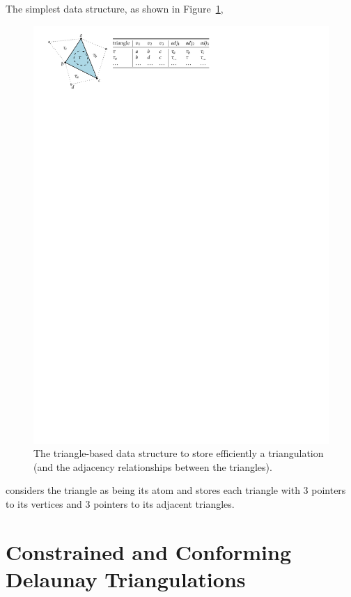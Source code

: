 The simplest data structure, as shown in Figure~\ref{fig:tr_ds}, 
\begin{figure}
  \centering
  \includegraphics[width=0.95\linewidth]{figs/tr_ds}
  \caption{The triangle-based data structure to store efficiently a triangulation (and the adjacency relationships between the triangles).}
\label{fig:tr_ds}
\end{figure}
considers the triangle as being its atom and stores each triangle with 3 pointers to its vertices and 3 pointers to its adjacent triangles. 




\section{Constrained and Conforming Delaunay Triangulations}

